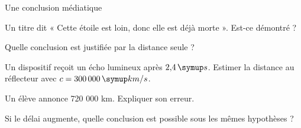 \par\noindent\begin{minipage}{\linewidth}
\begin{exercice}[3]{Une conclusion médiatique}
\begin{questions}
\item Un titre dit « Cette étoile est loin, donc elle est déjà morte ». Est-ce démontré ?
\item Quelle conclusion est justifiée par la distance seule ?
\end{questions}
\end{exercice}
\end{minipage}
\label{defi-ex-18}
\begin{questions}
\item Un dispositif reçoit un écho lumineux après $2{,}4\unite s$. Estimer la distance au réflecteur avec $c=300\,000\unite{km/s}$.
\item Un élève annonce 720 000 km. Expliquer son erreur.
\item Si le délai augmente, quelle conclusion est possible sous les mêmes hypothèses ?
\end{questions}
\pcGrille
